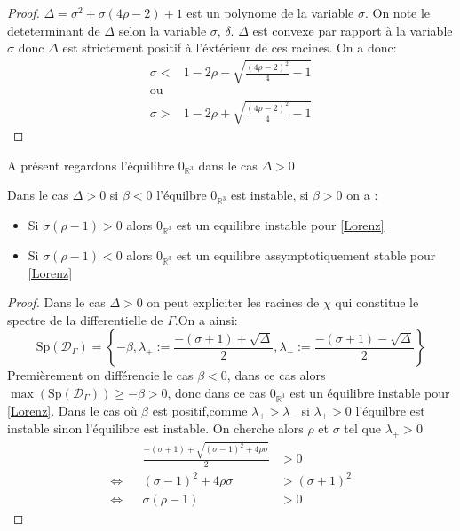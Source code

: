 \documentclass{article}
\newcommand{\R}{\mathbb{R}}
\newtheorem[M , nocut]{prop}{Proposition}[section]
\newtheorem[M]{propt}{Propriété}[section]
\newtheorem[L , nocut]{thm}{Théoreme}
\newtheorem[L]{cor}{Corollaire}
\begin{document}
\begin{proof}
    $\Delta = \sigma^2 + \sigma(4\rho-2) + 1$ est un polynome de la variable $\sigma$. On note le deteterminant de $\Delta$ selon la variable $\sigma$, $\delta$. $\Delta$ est convexe par rapport à la variable $\sigma$ donc $\Delta$ est strictement positif à l'éxtérieur de ces racines. On a donc:
    \begin{align*}
        \sigma <& 1-2 \rho - \sqrt{\frac{(4\rho-2)^2}{4} -1 }\\
        \text{ou}\\
        \sigma >& 1-2 \rho + \sqrt{\frac{(4\rho-2)^2}{4} -1 }
    \end{align*}
\end{proof}

A présent regardons l'équilibre $0_{\R^3}$ dans le cas $\Delta> 0$
\begin{prop}
    Dans le cas $\Delta>0$ si $\beta<0$ l'équilbre $0_{\R^3}$ est instable, si $\beta >0$ on a :
    \begin{itemize}
        \item Si $\sigma(\rho-1)>0$ alors $0_{\R^3}$ est un equilibre instable pour \eqref{Lorenz}
        \item Si $\sigma(\rho-1)<0$ alors $0_{\R^3}$ est un equilibre assymptotiquement stable pour \eqref{Lorenz}
    \end{itemize}
\end{prop}

\begin{proof}
    Dans le cas $\Delta>0$ on peut expliciter les racines de $\chi$ qui constitue le spectre de la differentielle de $\Gamma$.On a ainsi:
    \[
      \mathrm{Sp}(\mathcal{D}_\Gamma)= \left\{-\beta,\lambda_+ := \frac{-(\sigma+1) + \sqrt{\Delta}}{2},\lambda_- := \frac{-(\sigma+1) - \sqrt{\Delta}}{2}\right\}  
    \]
    Premièrement on différencie le cas $\beta<0$, dans ce cas alors $\max(\mathrm{Sp}(\mathcal{D}_\Gamma))\ge -\beta > 0$, donc dans ce cas $0_{\R^3}$ est un équilibre instable pour \eqref{Lorenz}. Dans le cas où $\beta$ est positif,comme $\lambda_+>\lambda_-$ si $\lambda_+ > 0$ l'équilbre est instable sinon l'équilibre est instable. On cherche alors $\rho$ et $\sigma$ tel que $\lambda_+>0$
    \begin{align*}
        && \frac{-(\sigma+1) + \sqrt{(\sigma-1)^2+4\rho\sigma}}{2} &>0 \\
        \Leftrightarrow && (\sigma-1)^2+4\rho\sigma &> (\sigma+1)^2 \\
        \Leftrightarrow && \sigma(\rho-1) &> 0
    \end{align*}
\end{proof}
\end{document}
